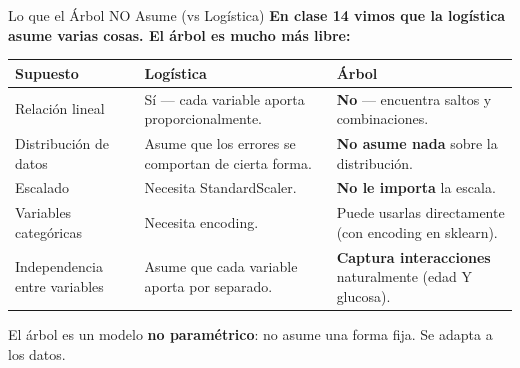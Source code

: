 \documentclass[aspectratio=169, 11pt]{beamer}
\begin{document}
\begin{frame}{Lo que el Árbol NO Asume (vs Logística)}
  \vspace{-4pt}
  {\footnotesize\color{arcaDark}\bfseries
    En clase 14 vimos que la logística \textbf{asume} varias cosas.
    El árbol es mucho más libre:}

  \vspace{6pt}
  {\scriptsize
  \begin{tabular}{@{}p{4cm}p{4cm}p{4.5cm}@{}}
    \toprule
    \textbf{Supuesto} & \textbf{\color{codeBlue}Logística} & \textbf{\color{arcaRed}Árbol} \\
    \midrule
    Relación lineal & Sí --- cada variable aporta proporcionalmente. & \textbf{No} --- encuentra saltos y combinaciones. \\
    Distribución de datos & Asume que los errores se comportan de cierta forma. & \textbf{No asume nada} sobre la distribución. \\
    Escalado & Necesita StandardScaler. & \textbf{No le importa} la escala. \\
    Variables categóricas & Necesita encoding. & Puede usarlas directamente (con encoding en sklearn). \\
    Independencia entre variables & Asume que cada variable aporta por separado. & \textbf{Captura interacciones} naturalmente (edad Y glucosa). \\
    \bottomrule
  \end{tabular}
  }

  \vspace{6pt}
  {\scriptsize\color{textMuted}
    \faLightbulb\hspace{4pt} El árbol es un modelo \textbf{no paramétrico}:
    no asume una forma fija. Se adapta a los datos.}
\end{frame}
\end{document}
